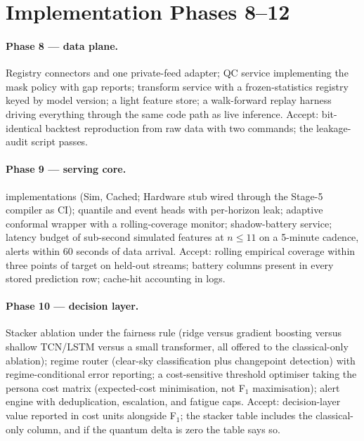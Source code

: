 \section{Implementation Phases 8--12}
\label{sec:prod-phases}

\paragraph{Phase 8 --- data plane.} Registry connectors and one
private-feed adapter; QC service implementing the mask policy with gap
reports; transform service with a frozen-statistics registry keyed by model
version; a light feature store; a walk-forward replay harness driving
everything through the same code path as live inference. Accept:
bit-identical backtest reproduction from raw data with two commands; the
leakage-audit script passes.

\paragraph{Phase 9 --- serving core.} 
implementations (Sim, Cached; Hardware stub wired through the Stage-5
compiler as CI); quantile and event heads with per-horizon leak; adaptive
conformal wrapper with a rolling-coverage monitor; shadow-battery service;
latency budget of sub-second simulated features at $n\le11$ on a 5-minute
cadence, alerts within 60 seconds of data arrival. Accept: rolling
empirical coverage within three points of target on held-out streams;
battery columns present in every stored prediction row; cache-hit
accounting in logs.

\paragraph{Phase 10 --- decision layer.} Stacker ablation under the
fairness rule (ridge versus gradient boosting versus shallow TCN/LSTM
versus a small transformer, all offered to the classical-only ablation);
regime router (clear-sky classification plus changepoint detection) with
regime-conditional error reporting; a cost-sensitive threshold optimiser
taking the persona cost matrix (expected-cost minimisation, not F$_1$
maximisation); alert engine with deduplication, escalation, and fatigue
caps. Accept: decision-layer value reported in cost units alongside F$_1$;
the stacker table includes the classical-only column, and if the quantum
delta is zero the table says so.


